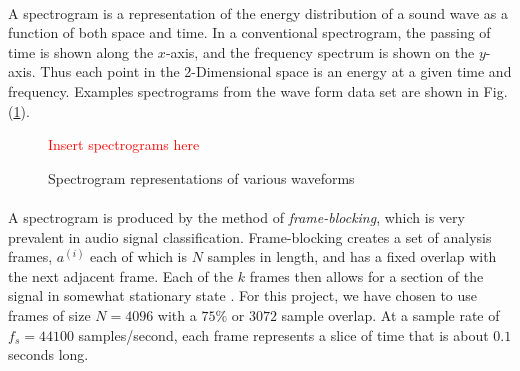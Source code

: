 \documentclass[12pt,letterpaper]{article}
\begin{document}
\paragraph*{}A spectrogram is a representation of the energy distribution of a sound wave as a function of both space and time. In a conventional spectrogram, the passing of time is shown along the $x$-axis, and the frequency spectrum is shown on the $y$-axis. Thus each point in the 2-Dimensional space is an energy at a given time and frequency. Examples spectrograms from the wave form data set are shown in Fig. (\ref{fig-spectrograms}).

\begin{figure}[H]
\begin{center}
\label{fig-spectrograms}
\textcolor{red}{Insert spectrograms here}
\caption{Spectrogram representations of various waveforms}
\end{center}
\end{figure}

\paragraph*{}A spectrogram is produced by the method of \textit{frame-blocking}, which is very prevalent in audio signal classification. Frame-blocking creates a set of analysis frames, $a^{(i)}$ each of which is $N$ samples in length, and has a fixed overlap with the next adjacent frame. Each of the $k$ frames then allows for a section of the signal in somewhat stationary state \cite{Liu,Zhan,Kahn,Virtanen}. For this project, we have chosen to use frames of size $N = 4096$ with a $75\%$ or $3072$ sample overlap. At a sample rate of $f_s = 44100$ samples/second, each frame represents a slice of time that is about $0.1$ seconds long. 
\end{document}

